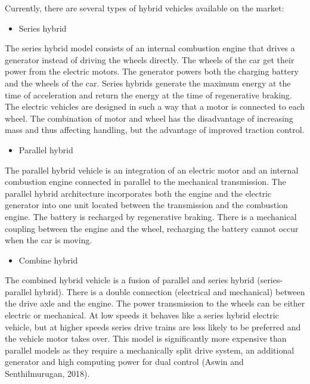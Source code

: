 \documentclass[
]{book}
\providecommand{\tightlist}{%
  \setlength{\itemsep}{0pt}\setlength{\parskip}{0pt}}
\begin{document}
Currently, there are several types of hybrid vehicles available on the market:

\begin{itemize}
\tightlist
\item
  Series hybrid
\end{itemize}

The series hybrid model consists of an internal combustion engine that drives a generator instead of driving the wheels directly. The wheels of the car get their power from the electric motors. The generator powers both the charging battery and the wheels of the car. Series hybrids generate the maximum energy at the time of acceleration and return the energy at the time of regenerative braking. The electric vehicles are designed in such a way that a motor is connected to each wheel. The combination of motor and wheel has the disadvantage of increasing mass and thus affecting handling, but the advantage of improved traction control.

\begin{itemize}
\tightlist
\item
  Parallel hybrid
\end{itemize}

The parallel hybrid vehicle is an integration of an electric motor and an internal combustion engine connected in parallel to the mechanical transmission. The parallel hybrid architecture incorporates both the engine and the electric generator into one unit located between the transmission and the combustion engine. The battery is recharged by regenerative braking. There is a mechanical coupling between the engine and the wheel, recharging the battery cannot occur when the car is moving.

\begin{itemize}
\tightlist
\item
  Combine hybrid
\end{itemize}

The combined hybrid vehicle is a fusion of parallel and series hybrid (series-parallel hybrid). There is a double connection (electrical and mechanical) between the drive axle and the engine. The power transmission to the wheels can be either electric or mechanical. At low speeds it behaves like a series hybrid electric vehicle, but at higher speeds series drive trains are less likely to be preferred and the vehicle motor takes over. This model is significantly more expensive than parallel models as they require a mechanically split drive system, an additional generator and high computing power for dual control (Aswin and Senthilmurugan, 2018).
\end{document}
